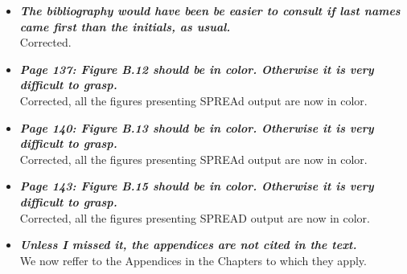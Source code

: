 \documentclass[english]{article}
\begin{document}
\begin{itemize}
\begin{quote}
{\bf  Epoch simulation scenarios on an influenza A maximum clade credibility tree topology.} 
In the two-epoch example illustrated by the top alternating background
the transition time is set at $t_{1}=7$, creating two epochs with substitution processes governed by infinitesimal rate matrices $\mathbf{Q_{1}}$ and $\mathbf{Q_{2}}$ respectively, separated by the light and dark grey areas and the dotted line.
In the three-epoch example illustrated 
by the bottom alternating background
transition times are put at $t_{1}=7$ and $t_{2}=15$, creating three epochs with substitution processes governed by infinitesimal rate matrices $\mathbf{Q_{1}}$, $\mathbf{Q_{2}}$ and then again $\mathbf{Q_{1}}$, as indicated by the alternating dark and light areas and the dotted lines.
\end{quote}



\item {
{\it
\textbf{
The bibliography would have been be easier to consult if last names came first than the initials, as usual.
}%
}%
}%
\\
Corrected.


\item {
{\it
\textbf{
Page 137: Figure B.12 should be in color. 
Otherwise it is very difficult to grasp.
}%
}%
}%
\\
Corrected, all the figures presenting SPREAd output are now in color.

\item {
{\it
\textbf{
Page 140: Figure B.13 should be in color. 
Otherwise it is very difficult to grasp.
}%
}%
}%
\\
Corrected, all the figures presenting SPREAd output are now in color.


\item {
{\it
\textbf{
Page 143: Figure B.15 should be in color. 
Otherwise it is very difficult to grasp.
}%
}%
}%
\\
Corrected, all the figures presenting SPREAD output are now in color.




\item {
{\it
\textbf{
Unless I missed it, the appendices are not cited in the text.
}%
}%
}%
\\
We now reffer to the Appendices in the Chapters to which they apply.


\end{itemize}












\end{document}
